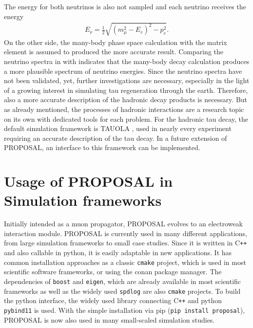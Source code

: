 The energy for both neutrinos is also not sampled and each neutrino receives the energy
\begin{align}
    E_\nu = \frac12 \sqrt{(m_\mu^2 - E_e)^2 - p_e^2} .
\end{align}
On the other side, the many-body phase space calculation with the matrix element is assumed to produced the more accurate result.
Comparing the neutrino spectra in  with  indicates that the many-body decay calculation produces a more plausible spectrum of neutrino energies.
Since the neutrino spectra have not been validated, yet, further investigations are necessary, especially in the light of a growing interest in simulating tau regeneration through the earth.
Therefore, also a more accurate description of the hadronic decay products is necessary.
But as already mentioned, the processes of hadronic interactions are a research topic on its own with dedicated tools for each problem.
For the hadronic tau decay, the default simulation framework is TAUOLA \cite{Jadach91, Jadach93, Davidson12, Chrzaszcz16}, used in nearly every experiment requiring an accurate description of the tau decay.
In a future extension of PROPOSAL, an interface to this framework can be implemented.

%
%

\section{Usage of PROPOSAL in Simulation frameworks}

Initially intended as a muon propagator, PROPOSAL evolves to an electroweak interaction module.
PROPOSAL is currently used in many different applications, from large simulation frameworks to small case studies.
Since it is written in C\texttt{++} and also callable in python, it is easily adaptable in new applications.
It has common installation approaches as a classic \texttt{cmake} project, which is used in most scientific software frameworks, or using the conan package manager.
The dependencies of \texttt{boost} and \texttt{eigen}, which are already available in most scientific frameworks as well as the widely used \texttt{spdlog} are also \texttt{cmake} projects.
To build the python interface, the widely used library connecting C\texttt{++} and python \texttt{pybind11} is used.
With the simple installation via pip (\texttt{pip install proposal}), PROPOSAL is now also used in many small-scaled simulation studies.


